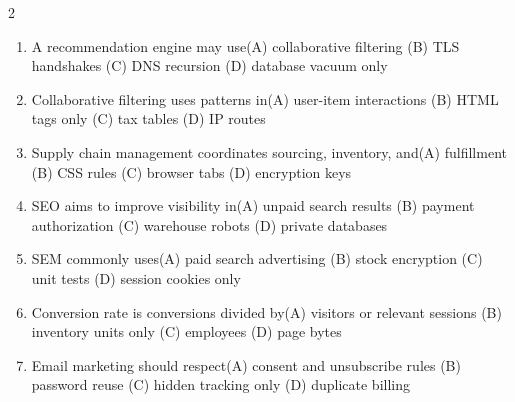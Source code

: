 \documentclass[a4paper]{article}
\begin{document}
\begin{multicols*}{2}
\fontsize{8.5}{10}\selectfont
\begin{enumerate}[resume]
\item A recommendation engine may use\newline\hspace*{0.6em}(A) collaborative filtering \quad (B) TLS handshakes \newline\hspace*{0.6em}(C) DNS recursion \quad (D) database vacuum only
\item Collaborative filtering uses patterns in\newline\hspace*{0.6em}(A) user-item interactions \quad (B) HTML tags only \newline\hspace*{0.6em}(C) tax tables \quad (D) IP routes
\item Supply chain management coordinates sourcing, inventory, and\newline\hspace*{0.6em}(A) fulfillment \quad (B) CSS rules \newline\hspace*{0.6em}(C) browser tabs \quad (D) encryption keys
\item SEO aims to improve visibility in\newline\hspace*{0.6em}(A) unpaid search results \quad (B) payment authorization \newline\hspace*{0.6em}(C) warehouse robots \quad (D) private databases
\item SEM commonly uses\newline\hspace*{0.6em}(A) paid search advertising \quad (B) stock encryption \newline\hspace*{0.6em}(C) unit tests \quad (D) session cookies only
\item Conversion rate is conversions divided by\newline\hspace*{0.6em}(A) visitors or relevant sessions \quad (B) inventory units only \newline\hspace*{0.6em}(C) employees \quad (D) page bytes
\item Email marketing should respect\newline\hspace*{0.6em}(A) consent and unsubscribe rules \quad (B) password reuse \newline\hspace*{0.6em}(C) hidden tracking only \quad (D) duplicate billing

\end{enumerate}
\end{multicols*}
\end{document}

